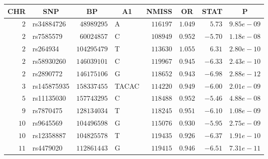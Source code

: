 \begin{center}
\begin{tabular}{rlrlrrrr}
\hline\hline
\multicolumn{1}{c}{CHR}&\multicolumn{1}{c}{SNP}&\multicolumn{1}{c}{BP}&\multicolumn{1}{c}{A1}&\multicolumn{1}{c}{NMISS}&\multicolumn{1}{c}{OR}&\multicolumn{1}{c}{STAT}&\multicolumn{1}{c}{P}\tabularnewline
\hline
$ 2$&rs34884726&$ 48989295$&A&$116197$&$1.049$&$ 5.73$&$9.85e-09$\tabularnewline
$ 2$&rs7585579&$ 60024857$&C&$108949$&$0.952$&$-5.70$&$1.18e-08$\tabularnewline
$ 2$&rs264934&$104295479$&T&$113630$&$1.055$&$ 6.31$&$2.80e-10$\tabularnewline
$ 2$&rs58930260&$146039101$&C&$119967$&$0.945$&$-6.33$&$2.43e-10$\tabularnewline
$ 2$&rs2890772&$146175106$&G&$118652$&$0.943$&$-6.98$&$2.88e-12$\tabularnewline
$ 3$&rs145875935&$158337455$&TACAC&$114220$&$0.949$&$-6.00$&$2.01e-09$\tabularnewline
$ 5$&rs11135030&$157743295$&C&$118488$&$0.952$&$-5.46$&$4.88e-08$\tabularnewline
$ 9$&rs7870475&$128134034$&T&$118245$&$0.951$&$-6.10$&$1.08e-09$\tabularnewline
$10$&rs9645569&$104496598$&G&$115076$&$0.930$&$-5.95$&$2.75e-09$\tabularnewline
$10$&rs12358887&$104825578$&T&$119435$&$0.926$&$-6.37$&$1.91e-10$\tabularnewline
$11$&rs4479020&$112861443$&G&$119415$&$0.946$&$-6.51$&$7.31e-11$\tabularnewline
\hline
\end{tabular}\end{center}
